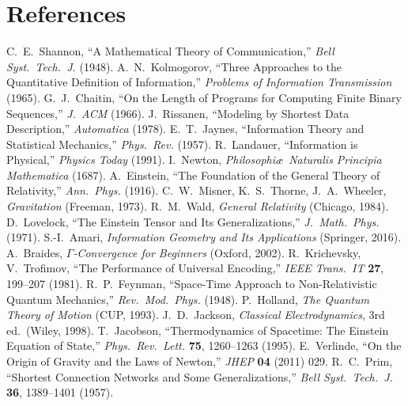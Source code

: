\documentclass[aps,preprint,onecolumn,longbibliography,nofootinbib]{revtex4-2}
\numberwithin{equation}{section}        %
\begin{document}
\section*{References}
\begin{thebibliography}{99}
 C.~E.~Shannon, ``A Mathematical Theory of Communication,'' \emph{Bell Syst.\ Tech.\ J.} (1948).
 A.~N.~Kolmogorov, ``Three Approaches to the Quantitative Definition of Information,'' \emph{Problems of Information Transmission} (1965).
 G.~J.~Chaitin, ``On the Length of Programs for Computing Finite Binary Sequences,'' \emph{J.\ ACM} (1966).
 J.~Rissanen, ``Modeling by Shortest Data Description,'' \emph{Automatica} (1978).
 E.~T.~Jaynes, ``Information Theory and Statistical Mechanics,'' \emph{Phys.\ Rev.} (1957).
 R.~Landauer, ``Information is Physical,'' \emph{Physics Today} (1991).
 I.~Newton, \emph{Philosophi\ae\ Naturalis Principia Mathematica} (1687).
 A.~Einstein, ``The Foundation of the General Theory of Relativity,'' \emph{Ann.\ Phys.} (1916).
 C.~W.~Misner, K.~S.~Thorne, J.~A.~Wheeler, \emph{Gravitation} (Freeman, 1973).
 R.~M.~Wald, \emph{General Relativity} (Chicago, 1984).
 D.~Lovelock, ``The Einstein Tensor and Its Generalizations,'' \emph{J.\ Math.\ Phys.} (1971).
 S.-I.~Amari, \emph{Information Geometry and Its Applications} (Springer, 2016).
 A.~Braides, \emph{$\Gamma$-Convergence for Beginners} (Oxford, 2002).
 R.~Krichevsky, V.~Trofimov, ``The Performance of Universal Encoding,'' \emph{IEEE Trans.\ IT} \textbf{27}, 199–207 (1981).
 R.~P.~Feynman, ``Space-Time Approach to Non-Relativistic Quantum Mechanics,'' \emph{Rev.\ Mod.\ Phys.} (1948).
 P.~Holland, \emph{The Quantum Theory of Motion} (CUP, 1993).
 J.~D.~Jackson, \emph{Classical Electrodynamics}, 3rd ed.\ (Wiley, 1998).
 T.~Jacobson, ``Thermodynamics of Spacetime: The Einstein Equation of State,'' \emph{Phys.\ Rev.\ Lett.} \textbf{75}, 1260–1263 (1995).
 E.~Verlinde, ``On the Origin of Gravity and the Laws of Newton,'' \emph{JHEP} \textbf{04} (2011) 029.
 R.~C.~Prim, ``Shortest Connection Networks and Some Generalizations,'' \emph{Bell Syst.\ Tech.\ J.} \textbf{36}, 1389–1401 (1957).
\end{thebibliography}
\end{document}
